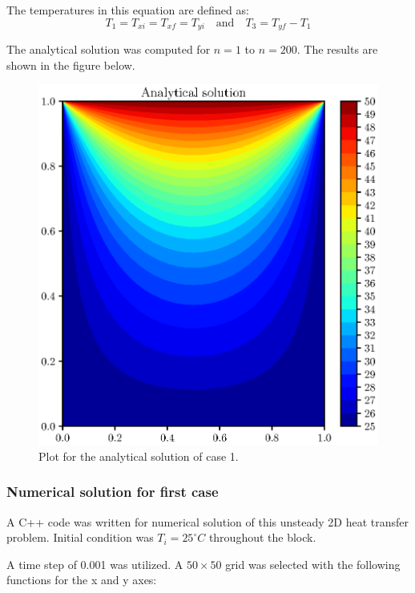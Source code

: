 \documentclass[12pt,a4paper,fleqn]{article}
\begin{document}
The temperatures in this equation are defined as:
\begin{equation}
T_1 = T_{xi} = T_{xf} = T_{yi} \quad\text{and}\quad T_3 = T_{yf} - T_1
\end{equation}

The analytical solution was computed for $n = 1$ to $n = 200$. The results are
shown in the figure below.

\begin{figure}[b!]
\centering
\includegraphics[width=\linewidth]{ht2dCase01Analytical.eps}
\caption{Plot for the analytical solution of case 1.}
\end{figure}

\newpage

\subsubsection*{Numerical solution for first case}

A C++ code was written for numerical solution of this unsteady 2D heat transfer
problem. Initial condition was $T_i=25^{\circ}C$ throughout the block.

A time step of 0.001 was utilized. A $50\times50$ grid was selected with the
following functions for the x and y axes:
\end{document}
